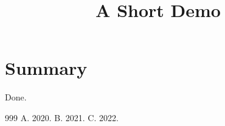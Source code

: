 \documentclass[article]{jss}
\title{A Short Demo}
\begin{document}
\section{Summary}
Done.
\begin{thebibliography}{999}
 A. 2020.
 B. 2021.
 C. 2022.
\end{thebibliography}
\end{document}

